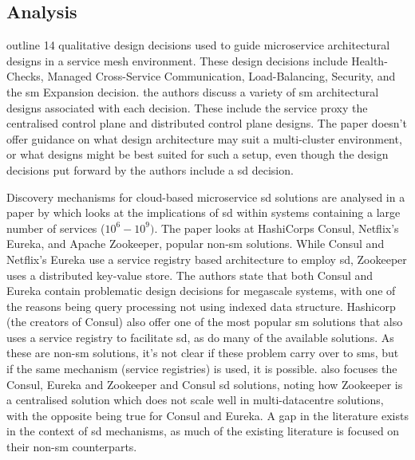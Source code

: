 \documentclass[12pt, a4paper, oneside]{article}
\begin{document}
\subsection{Analysis}
\citep{guidingAD} outline 14 qualitative design decisions used to guide microservice architectural designs in a service mesh environment. These design decisions include Health-Checks, Managed Cross-Service Communication, Load-Balancing, Security, and the \acrshort{sm} Expansion decision. the authors discuss a variety of \acrshort{sm} architectural designs associated with each decision. These include the service proxy the centralised control plane and distributed control plane designs. The paper doesn't offer guidance on what design architecture may suit a multi-cluster environment, or what designs might be best suited for such a setup, even though the design decisions put forward by the authors include a \acrshort{sd} decision.

Discovery mechanisms for cloud-based microservice \acrshort{sd} solutions are analysed in a paper by \cite{novelds} which looks at the implications of \acrshort{sd} within systems containing a large number of services ($10^6 - 10^9)$. The paper looks at HashiCorps Consul, Netflix's Eureka, and Apache Zookeeper, popular non-\acrshort{sm} solutions. While Consul and Netflix's Eureka use a service registry based architecture to employ \acrshort{sd}, Zookeeper uses a distributed key-value store. The authors state that both Consul and Eureka contain problematic design decisions for megascale systems, with one of the reasons being query processing not using indexed data structure. Hashicorp (the creators of Consul) also offer one of the most popular \acrshort{sm} solutions that also uses a service registry to facilitate \acrshort{sd}, as do many of the available solutions. As these are non-\acrshort{sm} solutions, it's not clear if these problem carry over to \acrshort{sm}s, but if the same mechanism (service registries) is used, it is possible. \cite{gtaco} also focuses the Consul, Eureka and Zookeeper and Consul \acrshort{sd} solutions, noting how Zookeeper is a centralised solution which does not scale well in multi-datacentre solutions, with the opposite being true for Consul and Eureka. A gap in the literature exists in the context of \acrshort{sd} mechanisms, as much of the existing literature is focused on their non-\acrshort{sm} counterparts.
\end{document}
